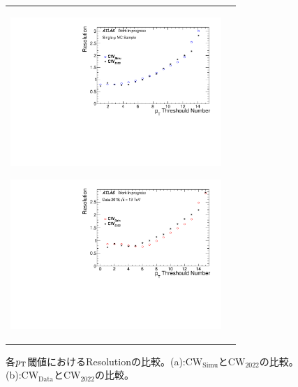 \begin{figure}
    \begin{tabular}{cc}
    \centering
    \begin{minipage}[b]{0.45\hsize}%
        \centering
        \hspace*{-1.5cm}
        \includegraphics[clip, width=8cm]{fig/5/v05vsv07_Resolution_re.pdf}
        \subcaption{}
        \label{fig:Resolution_v07v05}
    \end{minipage}%
    \begin{minipage}[b]{0.7\hsize}%
        \centering
        \hspace*{-0.75cm}
        \includegraphics[clip, width=8cm]{fig/5/v05vsv06_Resolution_re.pdf}
        \subcaption{}
        \label{fig:Resolution_v06v05}
    \end{minipage}%
    \end{tabular}
    \caption{各$p_{\rm{T}}$閾値におけるResolutionの比較。(a):$\mathrm{CW_{Simu}}$と$\mathrm{CW_{2022}}$の比較。(b):$\mathrm{CW_{Data}}$と$\mathrm{CW_{2022}}$の比較。}
    \label{fig:Resolution_v07v06v05}
\end{figure}

